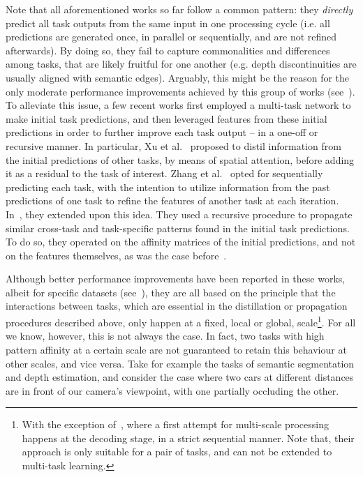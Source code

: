 \documentclass[runningheads]{llncs}
\begin{document}
Note that all aforementioned works so far follow a common pattern: they \textit{directly} predict all task outputs from the same input in one processing cycle (i.e. all predictions are generated once, in parallel or sequentially, and are not refined afterwards). By doing so, they fail to capture commonalities and differences among tasks, that are likely fruitful for one another (e.g. depth discontinuities are usually aligned with semantic edges). Arguably, this might be the reason for the only moderate performance improvements achieved by this group of works (see~\cite{maninis2019attentive}). To alleviate this issue, a few recent works first employed a multi-task network to make initial task predictions, and then leveraged features from these initial predictions in order to further improve each task output -- in a one-off or recursive manner. In particular, Xu et al.~\cite{xu2018pad} proposed to distil information from the initial predictions of other tasks, by means of spatial attention, before adding it as a residual to the task of interest. Zhang et al.~\cite{zhang2018joint} opted for sequentially predicting each task, with the intention to utilize information from the past predictions of one task to refine the features of another task at each iteration. In~\cite{zhang2019pattern}, they extended upon this idea. They used a recursive procedure to propagate similar cross-task and task-specific patterns found in the initial task predictions. To do so, they operated on the affinity matrices of the initial predictions, and not on the features themselves, as was the case before~\cite{xu2018pad,zhang2018joint}. 

Although better performance improvements have been reported in these works, albeit for specific datasets (see~\cite{xu2018pad}), they are all based on the principle that the interactions between tasks, which are essential in the distillation or propagation procedures described above, only happen at a fixed, local or global, scale\footnote{With the exception of~\cite{zhang2018joint}, where a first attempt for multi-scale processing happens at the decoding stage, in a strict sequential manner. Note that, their approach is only suitable for a pair of tasks, and can not be extended to multi-task learning.}. For all we know, however, this is not always the case. In fact, two tasks with high pattern affinity at a certain scale are not guaranteed to retain this behaviour at other scales, and vice versa. Take for example the tasks of semantic segmentation and depth estimation, and consider the case where two cars at different distances are in front of our camera's viewpoint, with one partially occluding the other.
\end{document}
